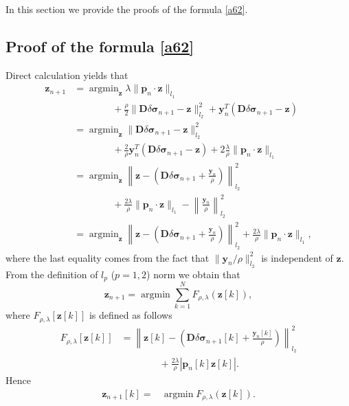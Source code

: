 \documentclass[lettersize,journal]{IEEEtran}
\def\y{\mathbf{y}}
\def\z{\mathbf{z}}
\def\D{\mathbf{D}}
\def\bfp{\mathbf{p}}
\def\f{\frac}
\def\bmsigma{\bm{\sigma}}
\def\argmin{\mathop{\arg\min}}
\begin{document}
\appendix
In this section we provide the proofs of the formula \eqref{a62}.


\subsection{Proof of the formula \eqref{a62}}

Direct calculation yields that
\begin{equation*}
\begin{split}
 \z_{n+1}& = \argmin_\z\lambda\|\mathbf{p}_n\cdot \mathbf{z}\|_{{l_1}} \\
 & \qquad\qquad +\frac{\rho}{2}\|\mathbf{D}\delta\bm{\sigma}_{n+1} - \mathbf{z}\|_{l_2}^{2}+\mathbf{y}_n^{T}(\mathbf{D}\delta\bm{\sigma}_{n+1} - \mathbf{z}) \\
& =\argmin_\z \|\mathbf{D}\delta\bm{\sigma}_{n+1} - \mathbf{z}\|_{l_2}^{2} \\
& \qquad\qquad +\f{2}{\rho}\mathbf{y}_n^{T}(\mathbf{D}\delta\bm{\sigma}_{n+1} - \mathbf{z}) + 2\f{\lambda}{\rho}\|\mathbf{p}_n\cdot \mathbf{z}\|_{{l_1}}\\
& = \argmin_\z\left\|\z-(\D\delta\bmsigma_{n+1}+\f{\y_n}{\rho})\right\|_{{l_2}}^2\\
&\qquad\qquad +\f{2\lambda}{\rho} \|\bfp_n\cdot \z\|_{l_1} -\left\|\f{\y_n}{\rho}\right\|_{{l_2}}^2 \\
& =\argmin_\z\left\|\z-(\D\delta\bmsigma_{n+1}+\f{\y_n}{\rho})\right\|_{{l_2}}^2+\f{2\lambda}{\rho} \|\bfp_n\cdot \z\|_{l_1},
\end{split}
\end{equation*}
where the last equality comes from the fact that $\|\y_n/\rho\|_{{l_2}}^2$ is independent of $\z$.
From the definition of $l_p$ ($p=1,2$) norm we obtain that
\begin{equation*}
  \z_{n+1} = \argmin\sum_{k=1}^N F_{\rho,\lambda}(\z[k]),
\end{equation*}
where $F_{\rho,\lambda}[\z[k]]$ is defined as follows
\begin{equation*}
  \begin{split}
    F_{\rho,\lambda}[\z[k]] & = \left\|\z[k]-\left(\D\delta\bmsigma_{n+1}[k]+\f{\y_n[k]}{\rho}\right)\right\|_{{l_2}}^2 \\
    &\qquad\qquad + \f{2\lambda}{\rho} |\bfp_n[k]\z[k]|.
  \end{split}
\end{equation*}
Hence
\begin{equation}\label{L1_minimizer1}
\begin{split}
  \z_{n+1}[k] = & \argmin F_{\rho,\lambda}(\z[k]).
\end{split}
\end{equation}
\end{document}
